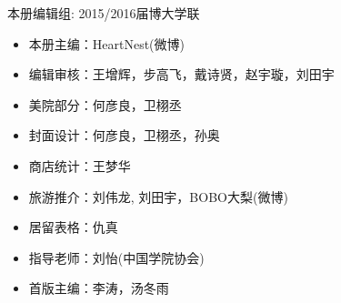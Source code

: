 \begin{titlepage}
\newpage

\topmargin=0cm 

\vspace{3cm}\centerline{\Large 本册编辑组: 2015/2016届博大学联} 

\begin{itemize}
\item[] 本册主编：HeartNest(微博)
\item[] 编辑审核：王增辉，步高飞，戴诗贤，赵宇璇，刘田宇
\item[] 美院部分：何彦良，卫栩丞
\item[] 封面设计：何彦良，卫栩丞，孙奥
\item[] 商店统计：王梦华
\item[] 旅游推介：刘伟龙, 刘田宇，BOBO大梨(微博)
\item[] 居留表格：仇真
\item[] 指导老师：刘怡(中国学院协会)
\item[] 首版主编：李涛，汤冬雨
\end{itemize}


\clearpage{\pagestyle{empty}\cleardoublepage}%
\end{titlepage}


\clearpage{\pagestyle{empty}\cleardoublepage}

{
\hypersetup{linkcolor=black}
\tableofcontents                        %

}
\clearpage{\pagestyle{empty}\cleardoublepage}
